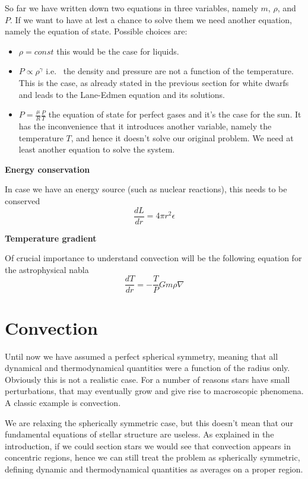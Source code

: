 So far we have written down two equations in three variables, namely $m$, $\rho$, and $P$. If we want to have at lest a chance to solve them we need another equation, namely the equation of state. Possible choices are:
\begin{itemize}
	\item $\rho=const$ this would be the case for liquids.
	\item $P\propto \rho^\gamma$ i.e. \ the density and pressure are not a function of the temperature. This is the case, as already stated in the previous section for white dwarfs and leads to the Lane-Edmen equation and its solutions.
	\item $P=\frac{\mu}{R}\frac{P}{T}$ the equation of state for perfect gases and it's the case for the sun. It has the inconvenience that it introduces another variable, namely the temperature $T$, and hence it doesn't solve our original problem. We need at least another equation to solve the system. 
\end{itemize}

\textbf{Energy conservation} 

In case we have an energy source (such as nuclear reactions), this needs to be conserved
\begin{equation}\label{energycons}
	\frac{dL}{dr} = 4 \pi r^2 \epsilon
\end{equation}

\textbf{Temperature gradient} 

Of crucial importance to understand convection will be the following equation for the astrophysical nabla
\begin{equation}\label{energytransfer}
\frac{d T}{d r} = - \frac{T }{P} G m \rho\nabla
\end{equation}


\section{Convection}
Until now we have assumed a perfect spherical symmetry, meaning that all dynamical and thermodynamical quantities were a function of the radius only. Obviously this is not a realistic case. For a number of reasons stars have small perturbations, that may eventually grow and give rise to macroscopic phenomena. A classic example is convection.

We are relaxing the spherically symmetric case, but this doesn't mean that our fundamental equations of stellar structure are useless. As explained in the introduction, if we could section stars we would see that convection appears in concentric regions, hence  we can still treat the problem as spherically symmetric, defining dynamic and thermodynamical quantities as averages on a proper region. 

